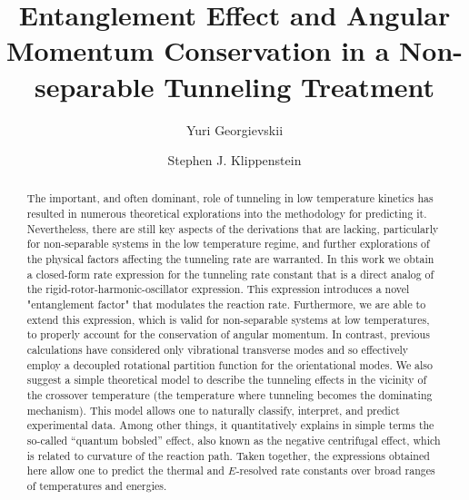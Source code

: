 \documentclass[journal=jpcafh,manuscript=article]{achemso}
\title{
  Entanglement Effect and Angular Momentum Conservation in a
  Non-separable Tunneling Treatment
}
\author{Yuri Georgievskii}
\author{Stephen J. Klippenstein}
\affiliation{ Chemical Sciences and Engineering Division, Argonne
National Laboratory, Lemont, IL 60439}
\begin{document}
\begin{abstract}
  The important, and often dominant, role of tunneling in low
  temperature kinetics has resulted in numerous theoretical
  explorations into the methodology for predicting it. Nevertheless,
  there are still key aspects of the derivations that are lacking,
  particularly for non-separable systems in the low temperature
  regime, and further explorations of the physical factors affecting
  the tunneling rate are warranted.  In this work we obtain a
  closed-form rate expression for the tunneling rate constant that is
  a direct analog of the rigid-rotor-harmonic-oscillator expression.
  This expression introduces a novel "entanglement factor" that
  modulates the reaction rate.  Furthermore, we are able to extend
  this expression, which is valid for non-separable systems at low
  temperatures, to properly account for the conservation of angular
  momentum.  In contrast, previous calculations have considered only
  vibrational transverse modes and so effectively employ a decoupled
  rotational partition function for the orientational modes.  We also
  suggest a simple theoretical model to describe the tunneling effects
  in the vicinity of the crossover temperature (the temperature where
  tunneling becomes the dominating mechanism). This model allows one
  to naturally classify, interpret, and predict experimental
  data. Among other things, it quantitatively explains in simple terms
  the so-called ``quantum bobsled'' effect, also known as the negative
  centrifugal effect, which is related to curvature of the reaction
  path. Taken together, the expressions obtained here allow one to
  predict the thermal and $E$-resolved rate constants over broad
  ranges of temperatures and energies.
\end{abstract}

\newcommand{\pint}{\ensuremath{\overbrace{\underbrace{\int\cdots\int}}\mathcal{D}}}

\renewcommand{\thesection}{\arabic{section}.}
\renewcommand{\thesubsection}{\arabic{section}.\arabic{subsection}}
\renewcommand{\theequation}{\arabic{section}.\arabic{equation}}

\setcounter{section}{0}
\setcounter{equation}{0}

\newpage
\end{document}
